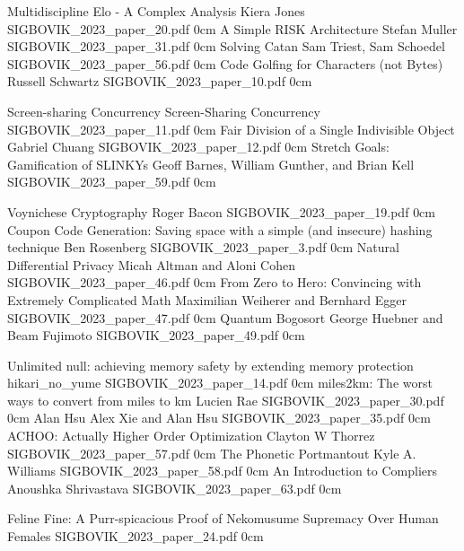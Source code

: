 \addpaper
	{Multidiscipline Elo - A Complex Analysis}
	{Kiera Jones}
	{}
	{SIGBOVIK_2023_paper_20.pdf}
	{0cm}
	{}
\addpaper
	{A Simple RISK Architecture}
	{Stefan Muller}
	{}
	{SIGBOVIK_2023_paper_31.pdf}
	{0cm}
	{}
\addpaper
	{Solving Catan}
	{Sam Triest, Sam Schoedel}
	{}
	{SIGBOVIK_2023_paper_56.pdf}
	{0cm}
	{}
\addpaper
	{Code Golfing for Characters (not Bytes)}
	{Russell Schwartz}
	{}
	{SIGBOVIK_2023_paper_10.pdf}
	{0cm}
	{}

\addpaper
	{Screen-sharing Concurrency}
	{Screen-Sharing Concurrency}
	{}
	{SIGBOVIK_2023_paper_11.pdf}
	{0cm}
	{}
\addpaper
	{Fair Division of a Single Indivisible Object}
	{Gabriel Chuang}
	{}
	{SIGBOVIK_2023_paper_12.pdf}
	{0cm}
	{}
\addpaper
	{Stretch Goals: Gamification of SLINKYs}
	{Geoff Barnes, William Gunther, and Brian Kell}
	{}
	{SIGBOVIK_2023_paper_59.pdf}
	{0cm}
	{}

\addpaper
	{Voynichese Cryptography}
	{Roger Bacon}
	{}
	{SIGBOVIK_2023_paper_19.pdf}
	{0cm}
	{}
\addpaper
	{Coupon Code Generation: Saving space with a simple (and insecure) hashing technique}
	{Ben Rosenberg}
	{}
	{SIGBOVIK_2023_paper_3.pdf}
	{0cm}
	{}
\addpaper
	{Natural Differential Privacy}
	{Micah Altman and Aloni Cohen}
	{}
	{SIGBOVIK_2023_paper_46.pdf}
	{0cm}
	{}
\addpaper
	{From Zero to Hero: Convincing with Extremely Complicated Math}
	{Maximilian Weiherer and Bernhard Egger}
	{}
	{SIGBOVIK_2023_paper_47.pdf}
	{0cm}
	{}
\addpaper
	{Quantum Bogosort}
	{George Huebner and Beam Fujimoto}
	{}
	{SIGBOVIK_2023_paper_49.pdf}
	{0cm}
	{}


\addpaper
	{Unlimited null: achieving memory safety by extending memory protection}
	{hikari\_no\_yume}
	{}
	{SIGBOVIK_2023_paper_14.pdf}
	{0cm}
	{}
\addpaper
	{miles2km: The worst ways to convert from miles to km}
	{Lucien Rae}
	{}
	{SIGBOVIK_2023_paper_30.pdf}
	{0cm}
	{}
\addpaper
	{Alan Hsu}
	{Alex Xie and Alan Hsu}
	{}
	{SIGBOVIK_2023_paper_35.pdf}
	{0cm}
	{}
\addpaper
	{ACHOO: Actually Higher Order Optimization}
	{Clayton W Thorrez}
	{}
	{SIGBOVIK_2023_paper_57.pdf}
	{0cm}
	{}
\addpaper
	{The Phonetic Portmantout}
	{Kyle A. Williams}
	{}
	{SIGBOVIK_2023_paper_58.pdf}
	{0cm}
	{}
\addpaper
	{An Introduction to Compliers}
	{Anoushka Shrivastava}
	{}
	{SIGBOVIK_2023_paper_63.pdf}
	{0cm}
	{}

\addpaper
	{Feline Fine: A Purr-spicacious Proof of Nekomusume Supremacy Over Human Females}
	{}
	{}
	{SIGBOVIK_2023_paper_24.pdf}
	{0cm}
	{}

